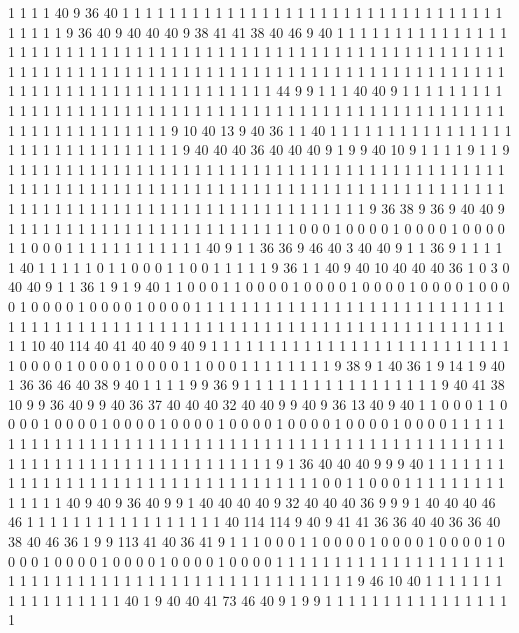 1 1 1 1 40 9 36 40 1 1 1 1 1 1 1 1 1 1 1 1
1 1 1 1 1 1 1 1 1 1 1 1 1 1 1 1 1 1 1 1
1 1 1 1 1 1 9 36 40 9 40 40 40 9 38 41 41 38 40 46
9 40 1 1 1 1 1 1 1 1 1 1 1 1 1 1 1 1 1 1
1 1 1 1 1 1 1 1 1 1 1 1 1 1 1 1 1 1 1 1
1 1 1 1 1 1 1 1 1 1 1 1 1 1 1 1 1 1 1 1
1 1 1 1 1 1 1 1 1 1 1 1 1 1 1 1 1 1 1 1
1 1 1 1 1 1 1 1 1 1 1 1 1 1 1 1 1 1 1 1
1 1 1 1 1 1 1 1 1 1 1 1 1 1 1 1 1 1 1 1
1 1 1 1 1 1 44 9 9 1 1 1 40 40 9 1 1 1 1 1
1 1 1 1 1 1 1 1 1 1 1 1 1 1 1 1 1 1 1 1
1 1 1 1 1 1 1 1 1 1 1 1 1 1 1 1 1 1 1 1
1 1 1 1 1 1 1 1 1 1 1 1 1 1 1 1 1 1 1 1
1 9 10 40 13 9 40 36 1 1 40 1 1 1 1 1 1 1 1 1
1 1 1 1 1 1 1 1 1 1 1 1 1 1 1 1 1 1 1 1
1 1 9 40 40 40 36 40 40 40 9 1 9 9 40 10 9 1 1 1
1 9 1 1 9 1 1 1 1 1 1 1 1 1 1 1 1 1 1 1
1 1 1 1 1 1 1 1 1 1 1 1 1 1 1 1 1 1 1 1
1 1 1 1 1 1 1 1 1 1 1 1 1 1 1 1 1 1 1 1
1 1 1 1 1 1 1 1 1 1 1 1 1 1 1 1 1 1 1 1
1 1 1 1 1 1 1 1 1 1 1 1 1 1 1 1 1 1 1 1
1 1 1 1 1 1 1 1 1 1 1 1 1 1 1 1 1 1 1 1
1 1 9 36 38 9 36 9 40 40 9 1 1 1 1 1 1 1 1 1
1 1 1 1 1 1 1 1 1 1 1 1 1 1 1 1 0 0 0 1
0 0 0 0 1 0 0 0 0 1 0 0 0 0 1 1 0 0 0 1
1 1 1 1 1 1 1 1 1 1 1 40 9 1 1 36 36 9 46 40
3 40 40 9 1 1 36 9 1 1 1 1 1 40 1 1 1 1 1 0
1 1 0 0 0 1 1 0 0 1 1 1 1 1 9 36 1 1 40 9
40 10 40 40 40 36 1 0 3 0 40 40 9 1 1 36 1 9 1 9
40 1 1 0 0 0 1 1 0 0 0 0 1 0 0 0 0 1 0 0
0 0 1 0 0 0 0 1 0 0 0 0 1 0 0 0 0 1 0 0
0 0 1 0 0 0 0 1 1 1 1 1 1 1 1 1 1 1 1 1
1 1 1 1 1 1 1 1 1 1 1 1 1 1 1 1 1 1 1 1
1 1 1 1 1 1 1 1 1 1 1 1 1 1 1 1 1 1 1 1
1 1 1 1 1 1 1 1 1 1 1 1 1 1 1 1 1 1 1 10
40 114 40 41 40 40 9 40 9 1 1 1 1 1 1 1 1 1 1 1
1 1 1 1 1 1 1 1 1 1 1 1 1 1 1 1 0 0 0 0
1 0 0 0 0 1 0 0 0 0 1 1 0 0 0 1 1 1 1 1
1 1 1 9 38 9 1 40 36 1 9 14 1 9 40 1 36 36 46 40
38 9 40 1 1 1 1 9 9 36 9 1 1 1 1 1 1 1 1 1
1 1 1 1 1 1 1 1 9 40 41 38 10 9 9 36 40 9 9 40
36 37 40 40 40 32 40 40 9 9 40 9 36 13 40 9 40 1 1 0
0 0 1 1 0 0 0 0 1 0 0 0 0 1 0 0 0 0 1 0
0 0 0 1 0 0 0 0 1 0 0 0 0 1 0 0 0 0 1 0
0 0 0 1 1 1 1 1 1 1 1 1 1 1 1 1 1 1 1 1
1 1 1 1 1 1 1 1 1 1 1 1 1 1 1 1 1 1 1 1
1 1 1 1 1 1 1 1 1 1 1 1 1 1 1 1 1 1 1 1
1 1 1 1 1 1 1 1 1 1 1 1 1 1 9 1 36 40 40 40
9 9 9 40 1 1 1 1 1 1 1 1 1 1 1 1 1 1 1 1
1 1 1 1 1 1 1 1 1 1 1 1 1 1 1 1 1 1 0 0
1 1 0 0 0 1 1 1 1 1 1 1 1 1 1 1 1 1 1 40
9 40 9 36 40 9 9 1 40 40 40 40 9 32 40 40 40 36 9 9
9 1 40 40 40 46 46 1 1 1 1 1 1 1 1 1 1 1 1 1
1 1 1 1 40 114 114 9 40 9 41 41 36 36 40 40 36 36 40 38
40 46 36 1 9 9 113 41 40 36 41 9 1 1 1 0 0 0 1 1
0 0 0 0 1 0 0 0 0 1 0 0 0 0 1 0 0 0 0 1
0 0 0 0 1 0 0 0 0 1 0 0 0 0 1 0 0 0 0 1
1 1 1 1 1 1 1 1 1 1 1 1 1 1 1 1 1 1 1 1
1 1 1 1 1 1 1 1 1 1 1 1 1 1 1 1 1 1 1 1
1 1 1 1 1 1 1 1 1 9 46 10 40 1 1 1 1 1 1 1
1 1 1 1 1 1 1 1 1 1 40 1 9 40 40 41 73 46 40 9
1 9 9 1 1 1 1 1 1 1 1 1 1 1 1 1 1 1 1 1
